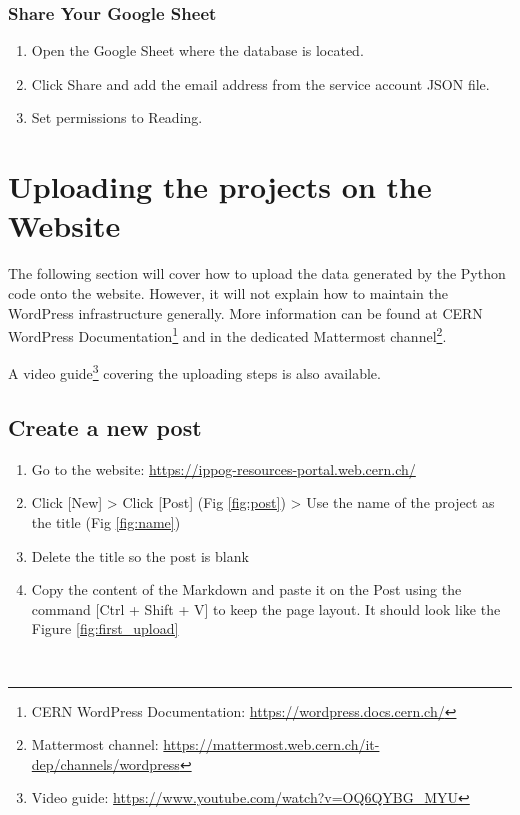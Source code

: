 \subsubsection*{Share Your Google Sheet}

\begin{enumerate}
    \item Open the Google Sheet where the database is located.
    \item Click Share and add the email address from the service account JSON file.
    \item Set permissions to Reading.
\end{enumerate}

\section{Uploading the projects on the Website}\label{sec:upload}

The following section will cover how to upload the data generated by the Python code onto the website. However, it will not explain how to maintain the WordPress infrastructure generally. More information can be found at CERN WordPress Documentation\footnote{CERN WordPress Documentation: \href{https://wordpress.docs.cern.ch/}{https://wordpress.docs.cern.ch/}} and in the dedicated Mattermost channel\footnote{Mattermost channel: \href{https://mattermost.web.cern.ch/it-dep/channels/wordpress}{https://mattermost.web.cern.ch/it-dep/channels/wordpress}}.

A video guide\footnote{Video guide: \href{https://www.youtube.com/watch?v=OQ6QYBG_MYU}{https://www.youtube.com/watch?v=OQ6QYBG\_MYU}} covering the uploading steps is also available. 

\newpage
\subsection*{Create a new post}\label{ssec:new_post}
\begin{enumerate}
    \item Go to the website: \href{https://ippog-resources-portal.web.cern.ch/}{https://ippog-resources-portal.web.cern.ch/}
    \item Click [New] > Click [Post] (Fig \ref{fig:post}) > Use the name of the project as the title (Fig \ref{fig:name})
    \item Delete the title so the post is blank
    \item Copy the content of the Markdown and paste it on the Post using the command [Ctrl + Shift + V] to keep  the page layout. It should look like the Figure \ref{fig:first_upload}
\end{enumerate}
\

